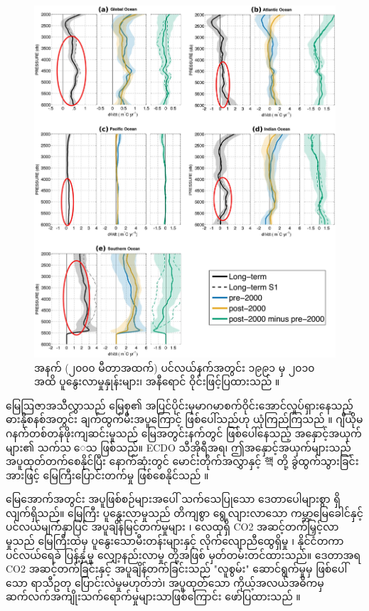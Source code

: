 \documentclass[10pt,twocolumn,letterpaper]{article}
\begin{document}
\begin{figure}[t]
\begin{center}
   \includegraphics[width=1\linewidth]{ocean-highlight.jpg}
\end{center}
   \caption{အနက် (၂၀၀၀ မီတာအထက်) ပင်လယ်နက်အတွင်း ၁၉၉၁ မှ ၂၀၁၀ အထိ ပူနွေးလာမှုနှုန်းများ၊ အနီရောင် ဝိုင်းဖြင့်ပြထားသည် \cite{132}။}
\label{fig:15}
\label{fig:onecol}
\end{figure}

မြေဩဇာအသီလွှာသည် မြေစု၏ အပြင်ပိုင်းမှမာဂမာစက်ဝိုင်းအောင်လှုပ်ရှားနေသည့် ဓားနိုစနစ်အတွင်း ချက်ထွက်မီးအပူကြောင့် ဖြစ်ပေါ်သည်ဟု ယုံကြည်ကြသည် \cite{123}။ ဂျီယိုမဂနက်တစ်တန်ဖိုးကျဆင်းမှုသည် မြေအတွင်းနက်တွင် ဖြစ်ပေါ်နေသည့် အနှောင့်အယှက်များ၏ သက်သ ေသ ဖြစ်သည်။ ECDO သီအိုရီအရ၊ ဤအနှောင့်အယှက်များသည် အပူထုတ်တက်စေနိုင်ပြီး နောက်ဆုံးတွင် မောင်းတိုက်အလွှာနှင့် 핵 တို့ ခွဲထွက်သွားခြင်းအားဖြင့် မြေကြီးပြောင်းတက်မှု ဖြစ်စေနိုင်သည် \cite{1}။

မြေအောက်အတွင်း အပူဖြစ်စဉ်များအပေါ် သက်သေပြုသော ဒေတာပေါများစွာ ရှိလျက်ရှိသည်။ မြေကြီး ပူနွေးလာမှုသည် တိကျစွာ ရွေ့လျားလာသော ကမ္ဘာ့မြေခေါင်နှင့် ပင်လယ်မျက်နှာပြင် အပူချိန်မြင့်တက်မှုများ \cite{127,128}၊ လေထုရှိ CO2 အဆင့်တက်မြှင့်လာမှုသည် မြေကြီးထဲမှ ပူနွေးသောမီးတန်းများနှင့် လိုက်လျောညီထွေရှိမှု \cite{129,130}၊ နိုင်ငံတကာပင်လယ်ရေခဲ ပြန့်နှံ့မှု လျှော့နည်းလာမှု \cite{131} တို့အဖြစ် မှတ်တမ်းတင်ထားသည်။ ဒေတာအရ CO2 အဆင့်တက်ခြင်းနှင့် အပူချိန်တက်ခြင်းသည် "လူစွမ်း" ဆောင်ရွက်မှုမှ ဖြစ်ပေါ်သော ရာသီဥတု ပြောင်းလဲမှုမဟုတ်ဘဲ၊ အပူထုတ်သော ကိုယ့်အလယ်အဓိကမှ ဆက်လက်အကျိုးသက်ရောက်မှုများသာဖြစ်ကြောင်း ဖော်ပြထားသည် \cite{129}။
\end{document}
